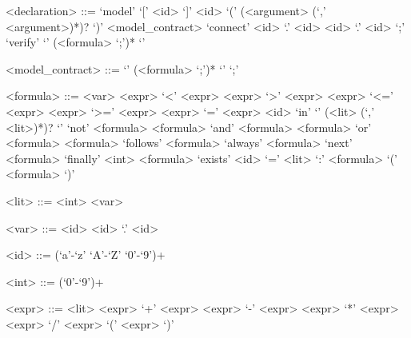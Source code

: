 \begin{grammar}
  <declaration> ::= `model' `[' <id> `]' <id> `(' (<argument> (`,' <argument>)*)? `)' <model\_contract>
  \alt `connect' <id> `.' <id> <id> `.' <id> `;'
  \alt `verify' `{' (<formula> `;')* `}'
  
  <model\_contract> ::= `{' (<formula> `;')* `}'
  \alt `;'
  
  <formula> ::= <var>
  \alt <expr> `<' <expr>
  \alt <expr> `>' <expr>
  \alt <expr> `<=' <expr>
  \alt <expr> `>=' <expr>
  \alt <expr> `=' <expr>
  \alt <id> `in' `{' (<lit> (`,' <lit>)*)? `}'
  \alt `not' <formula>
  \alt <formula> `and' <formula>
  \alt <formula> `or' <formula>
  \alt <formula> `follows' <formula>
  \alt `always' <formula>
  \alt `next' <formula>
  \alt `finally' <int> <formula>
  \alt `exists' <id> `=' <lit> `:' <formula>
  \alt `(' <formula> `)'
  
  <lit> ::= <int>
  \alt <var>
  
  <var> ::= <id>
  \alt <id> `.' <id>
  
  <id> ::= (`a'-`z' `A'-`Z' `0'-`9')+
  
  <int> ::= (`0'-`9')+
  
  <expr> ::= <lit>
  \alt <expr> `+' <expr>
  \alt <expr> `-' <expr>
  \alt <expr> `*' <expr>
  \alt <expr> `/' <expr>
  \alt `(' <expr> `)'
\end{grammar}
